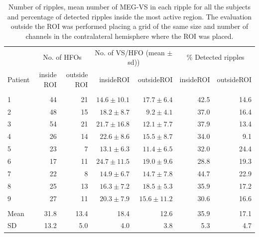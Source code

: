 \begin{table}[]
\centering
\caption{Number of ripples, mean number of MEG-VS in each ripple for all the subjects and percentage of detected ripples inside the most active region. The evaluation outside the ROI was performed placing a grid of the same size and number of channels in the contralateral hemisphere where the ROI was placed.}
\small
\vspace{3mm}
\label{tbl:3-4}
\begin{tabular}{lrrrrrr}
                 & \multicolumn{2}{c}{No. of HFOs}  & \multicolumn{2}{c}{No. of VS/HFO (mean $\pm$ sd))} & \multicolumn{2}{c}{\% Detected ripples} \\
Patient & inside ROI & outside ROI & insideROI  & outsideROI    & insideROI  & outsideROI      \\
\hline 
		&		&		&					&					&		&		\\
1       & 44    & 21    & $14.6 \pm 10.1$	& $17.7 \pm 6.4$	& 42.5 	& 14.6	\\
2       & 48    & 15    & $18.2 \pm 8.7$	& $9.2 \pm 4.1$     & 37.0	& 16.4 	\\
3     	& 54    & 21	& $21.7 \pm 16.8$	& $12.1 \pm 7.7$    & 37.9  & 13.4 	\\
4       & 26	& 14	& $22.6 \pm 8.6$	& $15.5 \pm 8.7$ 	& 34.0 	& 9.1	\\
5       & 23	& 7		& $13.1 \pm 6.3$	& $11.4 \pm 6.5$	& 32.0 	& 24.4	\\
6		& 17	& 11	& $24.7 \pm 11.5$	& $19.0 \pm 9.6$	& 28.8  & 19.3 	\\
7       & 22 	& 8		& $14.9 \pm 6.7$ 	& $14.7 \pm 7.8$ 	& 44.7  & 22.9 	\\
8       & 25	& 13	& $16.3 \pm 7.2$	& $18.5 \pm 5.3$	& 35.9 	& 17.2 	\\
9       & 27 	& 11	& $20.3 \pm 7.9$	& $15.6 \pm 11.2$ 	& 30.6 	& 16.6	\\
		&		&		&					&					&		&		\\	
Mean    & 31.8	& 13.4	& 18.4 				& 12.6				& 35.9 	& 17.1	\\
SD      & 13.2  & 5.0   & 4.0               & 3.8               & 5.3   & 4.7                                         
\end{tabular}
\end{table}




